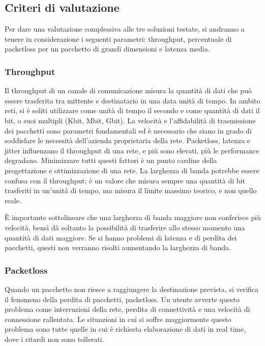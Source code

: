 \subsection{Criteri di valutazione}
Per dare una valutazione complessiva alle tre soluzioni testate, si andranno a tenere in considerazione i seguenti parametri: throughput, percentuale di packetloss per un pacchetto di grandi dimensioni e latenza media.

\subsubsection{Throughput}
Il throughput di un canale di comunicazione misura la quantità di dati che può essere trasferita tra mittente e destinatario in una data unità di tempo. In ambito reti, si è soliti utilizzare come unità di tempo il secondo e come quantità di dati il bit, o suoi multipli (Kbit, Mbit, Gbit).
La velocità e l'affidabilità di trasmissione dei pacchetti sono parametri fondamentali ed è necessario che siano in grado di soddisfare le necessità dell'azienda proprietaria della rete. Packetloss, latenza e jitter influenzano il throughput di una rete, e più sono elevati, più le performance degradano. Minimizzare tutti questi fattori è un punto cardine della progettazione e ottimizzazione di una rete.
La larghezza di banda potrebbe essere confusa con il throughput; è un valore che misura sempre una quantità di bit trasferiti in un'unità di tempo, ma misura il limite massimo teorico, e non quello reale.

È importante sottolineare che una larghezza di banda maggiore non conferisce più velocità, bensì dà soltanto la possibilità di trasferire allo stesso momento una quantità di dati maggiore. Se si hanno problemi di latenza e di perdita dei pacchetti, questi non verranno risolti aumentando la larghezza di banda.


\subsubsection{Packetloss}
Quando un pacchetto non riesce a raggiungere la destinazione prevista, si verifica il fenomeno della perdita di pacchetti, packetloss.
Un utente avverte questo problema come interruzioni della rete, perdita di connettività e una velocità di connessione rallentata.
Le situazioni in cui si soffre maggiormente questo problema sono tutte quelle in cui è richiesta elaborazione di dati in real time, dove i ritardi non sono tollerati.

